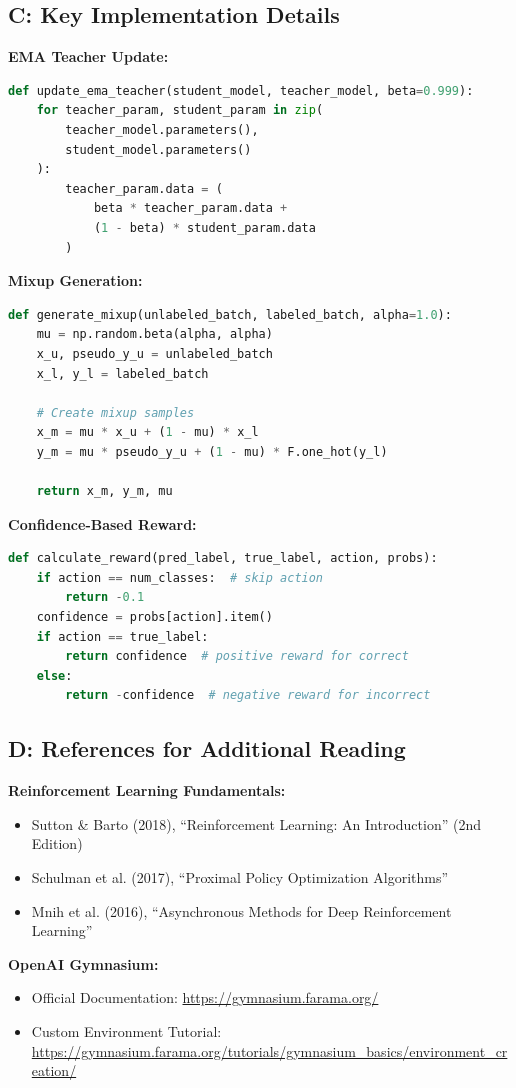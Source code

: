 \documentclass{scrartcl}
\begin{document}
\subsection{C: Key Implementation Details}

\textbf{EMA Teacher Update:}
\begin{lstlisting}[language=Python]
def update_ema_teacher(student_model, teacher_model, beta=0.999):
    for teacher_param, student_param in zip(
        teacher_model.parameters(), 
        student_model.parameters()
    ):
        teacher_param.data = (
            beta * teacher_param.data + 
            (1 - beta) * student_param.data
        )
\end{lstlisting}

\textbf{Mixup Generation:}
\begin{lstlisting}[language=Python]
def generate_mixup(unlabeled_batch, labeled_batch, alpha=1.0):
    mu = np.random.beta(alpha, alpha)
    x_u, pseudo_y_u = unlabeled_batch
    x_l, y_l = labeled_batch
    
    # Create mixup samples
    x_m = mu * x_u + (1 - mu) * x_l
    y_m = mu * pseudo_y_u + (1 - mu) * F.one_hot(y_l)
    
    return x_m, y_m, mu
\end{lstlisting}

\textbf{Confidence-Based Reward:}
\begin{lstlisting}[language=Python]
def calculate_reward(pred_label, true_label, action, probs):
    if action == num_classes:  # skip action
        return -0.1
    confidence = probs[action].item()
    if action == true_label:
        return confidence  # positive reward for correct
    else:
        return -confidence  # negative reward for incorrect
\end{lstlisting}

\subsection{D: References for Additional Reading}

\textbf{Reinforcement Learning Fundamentals:}
\begin{itemize}
    \item Sutton \& Barto (2018), ``Reinforcement Learning: An Introduction'' (2nd Edition)
    \item Schulman et al. (2017), ``Proximal Policy Optimization Algorithms''
    \item Mnih et al. (2016), ``Asynchronous Methods for Deep Reinforcement Learning''
\end{itemize}

\textbf{OpenAI Gymnasium:}
\begin{itemize}
    \item Official Documentation: \url{https://gymnasium.farama.org/}
    \item Custom Environment Tutorial: \url{https://gymnasium.farama.org/tutorials/gymnasium_basics/environment_creation/}
\end{itemize}
\end{document}
